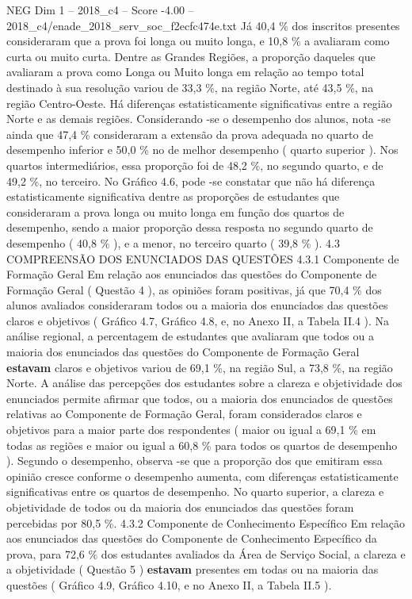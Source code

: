 \begin{textsample}{NEG Dim 1 – 2018\_c4 – Score -4.00 – 2018\_c4/enade\_2018\_serv\_soc\_f2ecfc474e.txt}
Já 40,4 \% dos inscritos presentes consideraram que a prova foi longa ou muito longa, e 10,8 \% a avaliaram como curta ou muito curta.
Dentre as Grandes Regiões, a proporção daqueles que avaliaram a prova como Longa ou Muito longa em relação ao tempo total destinado à sua resolução variou de 33,3 \%, na região Norte, até 43,5 \%, na região Centro-Oeste.
Há diferenças estatisticamente significativas entre a região Norte e as demais regiões.
Considerando -se o desempenho dos alunos, nota -se ainda que 47,4 \% consideraram a extensão da prova adequada no quarto de desempenho inferior e 50,0 \% no de melhor desempenho ( quarto superior ).
Nos quartos intermediários, essa proporção foi de 48,2 \%, no segundo quarto, e de 49,2 \%, no terceiro.
No Gráfico 4.6, pode -se constatar que não há diferença estatisticamente significativa dentre as proporções de estudantes que consideraram a prova longa ou muito longa em função dos quartos de desempenho, sendo a maior proporção dessa resposta no segundo quarto de desempenho ( 40,8 \% ), e a menor, no terceiro quarto ( 39,8 \% ). 4.3 COMPREENSÃO DOS ENUNCIADOS DAS QUESTÕES 4.3.1 Componente de Formação Geral Em relação aos enunciados das questões do Componente de Formação Geral ( Questão 4 ), as opiniões foram positivas, já que 70,4 \% dos alunos avaliados consideraram todos ou a maioria dos enunciados das questões claros e objetivos ( Gráfico 4.7, Gráfico 4.8, e, no Anexo II, a Tabela II.4 ).
Na análise regional, a percentagem de estudantes que avaliaram que todos ou a maioria dos enunciados das questões do Componente de Formação Geral \textbf{estavam} claros e objetivos variou de 69,1 \%, na região Sul, a 73,8 \%, na região Norte.
A análise das percepções dos estudantes sobre a clareza e objetividade dos enunciados permite afirmar que todos, ou a maioria dos enunciados de questões relativas ao Componente de Formação Geral, foram considerados claros e objetivos para a maior parte dos respondentes ( maior ou igual a 69,1 \% em todas as regiões e maior ou igual a 60,8 \% para todos os quartos de desempenho ).
Segundo o desempenho, observa -se que a proporção dos que emitiram essa opinião cresce conforme o desempenho aumenta, com diferenças estatisticamente significativas entre os quartos de desempenho.
No quarto superior, a clareza e objetividade de todos ou da maioria dos enunciados das questões foram percebidas por 80,5 \%. 4.3.2 Componente de Conhecimento Específico Em relação aos enunciados das questões do Componente de Conhecimento Específico da prova, para 72,6 \% dos estudantes avaliados da Área de Serviço Social, a clareza e a objetividade ( Questão 5 ) \textbf{estavam} presentes em todas ou na maioria das questões ( Gráfico 4.9, Gráfico 4.10, e no Anexo II, a Tabela II.5 ).

\end{textsample}
